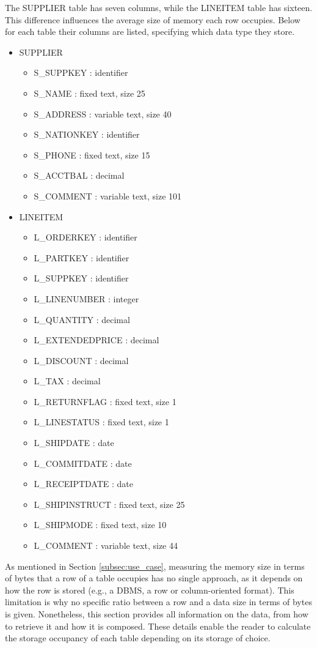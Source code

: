 The SUPPLIER table has seven columns, while the LINEITEM table has sixteen. This difference influences the average size of memory each row occupies. Below for each table their columns are listed, specifying which data type they store.
\begin{itemize}
  \item SUPPLIER
  \begin{itemize}
    \item S\_SUPPKEY : identifier
    \item S\_NAME : fixed text, size 25
    \item S\_ADDRESS : variable text, size 40
    \item S\_NATIONKEY : identifier
    \item S\_PHONE : fixed text, size 15
    \item S\_ACCTBAL : decimal
    \item S\_COMMENT : variable text, size 101
  \end{itemize}
  \item LINEITEM
  \begin{itemize}
    \item L\_ORDERKEY : identifier
    \item L\_PARTKEY : identifier
    \item L\_SUPPKEY : identifier
    \item L\_LINENUMBER : integer
    \item L\_QUANTITY : decimal
    \item L\_EXTENDEDPRICE : decimal
    \item L\_DISCOUNT : decimal
    \item L\_TAX : decimal
    \item L\_RETURNFLAG : fixed text, size 1
    \item L\_LINESTATUS : fixed text, size 1
    \item L\_SHIPDATE : date
    \item L\_COMMITDATE : date
    \item L\_RECEIPTDATE : date
    \item L\_SHIPINSTRUCT : fixed text, size 25
    \item L\_SHIPMODE : fixed text, size 10
    \item L\_COMMENT : variable text, size 44
  \end{itemize} 
\end{itemize}
As mentioned in Section \ref{subsec:use_case}, measuring the memory size in terms of bytes that a row of a table occupies has no single approach, as it depends on how the row is stored (e.g., a \gls{DBMS}, a row or column-oriented format). This limitation is why no specific ratio between a row and a data size in terms of bytes is given. Nonetheless, this section provides all information on the data, from how to retrieve it and how it is composed. These details enable the reader to calculate the storage occupancy of each table depending on its storage of choice.


